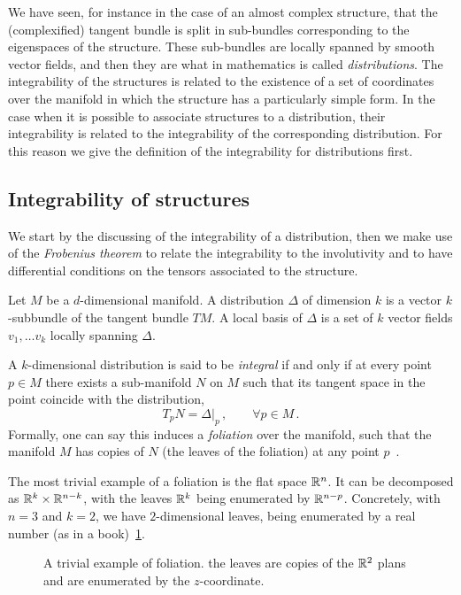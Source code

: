\documentclass[debug]{phd}
\begin{document}
				We have seen, for instance in the case of an almost complex structure, that the (complexified) tangent bundle is split in sub-bundles corresponding to the eigenspaces of the structure.
				These sub-bundles are locally spanned by smooth vector fields, and then they are what in mathematics is called \emph{distributions}.
				The integrability of the structures is related to the existence of a set of coordinates over the manifold in which the structure has a particularly simple form.
				In the case when it is possible to associate structures to a distribution, their integrability is related to the integrability of the corresponding distribution.
				For this reason we give the definition of the integrability for distributions first.
			\subsection{Integrability of structures}
					We start by the discussing of the integrability of a distribution, then we make use of the \emph{Frobenius theorem} to relate the integrability to the involutivity and to have differential conditions on the tensors associated to the structure.
			
					Let $M$ be a $d$-dimensional manifold.
					A distribution $\Delta$ of dimension $k$ is a vector $k$-subbundle of the tangent bundle $TM$.
					A local basis of $\Delta$ is a set of $k$ vector fields $v_1, \ldots v_k$ locally spanning $\Delta$.
					
					A $k$-dimensional distribution is said to be \emph{integral} if and only if at every point $p \in M$ there exists a sub-manifold $N$ on $M$ such that its tangent space in the point coincide with the distribution,
							\begin{equation*}
								T_p N = \Delta\vert_p \, , \qquad \forall p \in M \, .
							\end{equation*}
					Formally, one can say this induces a \emph{foliation} over the manifold, such that the manifold $M$ has copies of $N$ (the leaves of the foliation) at any point $p$~\cite{LawsFoli}.
					
					The most trivial example of a foliation is the flat space $\mathbb{R}^n$. It can be decomposed as $\mathbb{R}^k \times \mathbb{R}^{n-k}$, with the leaves $\mathbb{R}^k$ being enumerated by $\mathbb{R}^{n-p}$.
					Concretely, with $n=3$ and $k=2$, we have $2$-dimensional leaves, being enumerated by a real number (as in a book)~\cref{foliation}.
							\begin{figure}[h!]
							\centering
								\scalebox{1.2}{}
								\caption{A trivial example of foliation. the leaves are copies of the $\mathbb{R}^2$ plans and are enumerated by the $z$-coordinate.}
								\label{foliation}
							\end{figure}
					
\end{document}
